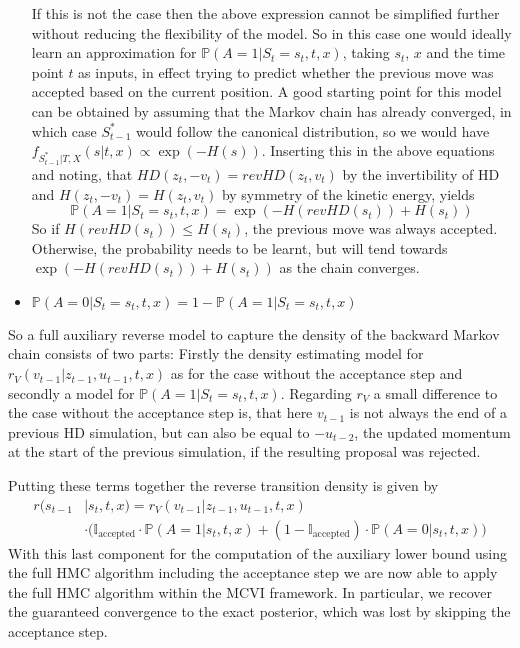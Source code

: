 \begin{itemize}
If this is not the case then the above expression cannot be simplified further without reducing the flexibility of the model. So in this case one would ideally learn an approximation for $\mathbb{P}(A=1|S_t = s_t, t, x)$, taking $s_t$, $x$ and the time point $t$ as inputs, in effect trying to predict whether the previous move was accepted based on the current position. A good starting point for this model can be obtained by assuming that the Markov chain has already converged, in which case $S_{t-1}^*$ would follow the canonical distribution, so we would have $f_{S^*_{t-1}|T, X}(s| t, x) \propto \exp(-H(s))$. Inserting this in the above equations and noting, that $HD(z_t, -v_t) = revHD(z_t, v_t)$ by the invertibility of HD and $H(z_t, -v_t) = H(z_t, v_t)$ by symmetry of the kinetic energy, yields
\begin{equation}
\mathbb{P}(A = 1|S_t = s_t, t, x) = \exp(-H(revHD(s_t)) + H(s_t))
\end{equation}
So if $H(revHD(s_t)) \leq H(s_t)$, the previous move was always accepted. Otherwise, the probability needs to be learnt, but will tend towards $\exp(-H(revHD(s_t)) + H(s_t))$ as the chain converges. 
\item $\mathbb{P}(A = 0|S_t = s_t, t, x) = 1 - \mathbb{P}(A = 1|S_t = s_t, t, x)$
\end{itemize}

So a full auxiliary reverse model to capture the density of the backward Markov chain consists of two parts: Firstly the density estimating model for $r_V(v_{t-1}|z_{t-1}, u_{t-1}, t, x)$ as for the case without the acceptance step and secondly a model for $\mathbb{P}(A = 1|S_t = s_t, t, x)$. Regarding $r_V$ a small difference to the case without the acceptance step is, that here $v_{t-1}$ is not always the end of a previous HD simulation, but can also be equal to  $-u_{t-2}$, the updated momentum at the start of the previous simulation, if the resulting proposal was rejected. 

Putting these terms together the reverse transition density is given by
\begin{equation}
\begin{split}
r(s_{t-1} &| s_t, t, x) = r_V(v_{t-1}| z_{t-1}, u_{t-1}, t, x) \\
&\cdot \Big( \mathbb{I}_\textrm{accepted} \cdot \mathbb{P}(A = 1 | s_{t}, t, x) + (1 - \mathbb{I}_\textrm{accepted}) \cdot \mathbb{P}(A = 0 | s_{t}, t, x) \Big)
\end{split}
\end{equation}
With this last component for the computation of the auxiliary lower bound using the full HMC algorithm including the acceptance step we are now able to apply the full HMC algorithm within the MCVI framework. In particular, we recover the guaranteed convergence to the exact posterior, which was lost by skipping the acceptance step.

